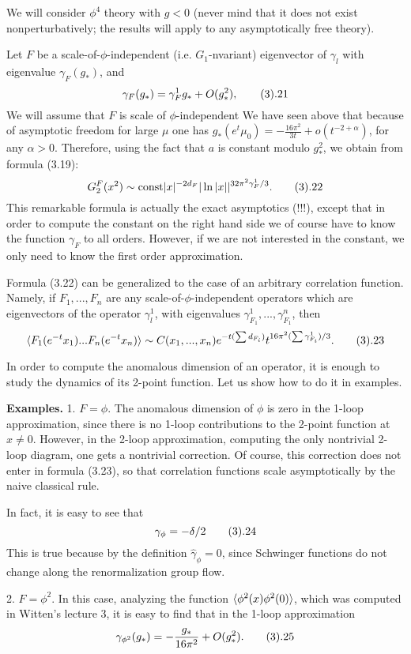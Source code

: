 We will consider $\phi^4$ theory with $g<0$ (never mind that 
it does not exist nonperturbatively; the results will apply to any 
asymptotically free theory).

Let $F$ be a
scale-of-$\phi$-independent (i.e. $G_1$-nvariant)
 eigenvector of $\gamma_l$ with eigenvalue $\gamma_F(g_*)$, and
$$
\gamma_F(g_*)=\gamma_F^1g_*+O(g_*^2),\tag 3.21
$$
We will assume that $F$ is scale of $\phi$-independent
We have seen above that because of asymptotic freedom for large $\mu$ 
one has $g_*(e^t\mu_0)=-\frac{16\pi^2}{3t}
+o(t^{-2+\alpha})$, for any $\alpha>0$. 
Therefore, using the fact that $a$ is constant modulo $g_*^2$, 
we obtain from formula (3.19):
$$
G_2^F(x^2)\sim \text{const} |x|^{-2d_F}|\ln|x||^{32\pi^2\gamma_F^1/3}.
\tag 3.22
$$
This remarkable formula is actually the exact asymptotics (!!!), except that
in order to compute the constant on the right hand side we of 
course have to know the function $\gamma_F$ to all orders. 
However, if we are not interested in the constant, we only need to know 
the first order approximation. 

Formula (3.22) can be generalized to the case of an arbitrary 
correlation function. Namely, if $F_1,...,F_n$ are any 
scale-of-$\phi$-independent operators 
which are eigenvectors of the operator $\gamma_l^1$, 
with eigenvalues $\gamma_{F_1}^1,...,\gamma_{F_1}^n$, then 
$$
\<F_1(e^{-t}x_1)...F_n(e^{-t}x_n)\>\sim 
C(x_1,...,x_n) e^{-t(\sum d_{F_i})}t^{16\pi^2(\sum \gamma_{F_i}^1)/3}.\tag
3.23
$$

In order to compute the anomalous dimension of an operator, 
it is enough to study the dynamics of its 2-point function. 
Let us show how to do it in examples. 

{\bf Examples.} 1. $F=\phi$. The anomalous dimension of $\phi$ is zero in
the 1-loop approximation, since there is no 1-loop 
contributions to the 2-point function at $x\ne 0$. 
However, in the 2-loop approximation, computing the only 
nontrivial 2-loop diagram, one gets a nontrivial correction. 
Of course, this correction does not enter in formula (3.23), so that 
correlation functions scale asymptotically by the naive classical rule. 

In fact, it is easy to see that 
$$
\gamma_\phi=-\delta/2\tag 3.24
$$ 
This is true because
 by the definition $\hat\gamma_\phi=0$, since Schwinger functions
do not change along the renormalization group flow. 

2. $F=\phi^2$. In this case, analyzing the function 
$\langle\phi^2(x)\phi^2(0)\rangle$, which was computed in Witten's lecture 3, 
it is easy to find that 
in the 1-loop approximation
$$
\gamma_{\phi^2}(g_*)=-\frac{g_*}{16\pi^2}+O(g_*^2).\tag 3.25
$$

